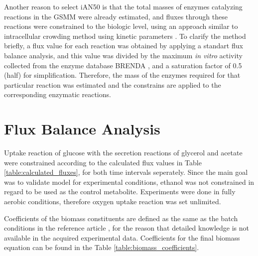 Another reason to select iAN50 is that the total masses of enzymes catalyzing reactions in the GSMM were already estimated, and fluxes through these reactions were constrained to the biologic level, using an approach similar to intracellular crowding method using kinetic parameters \cite{beg2007intracellular, adadi2012prediction}. To clarify the method briefly, a flux value for each reaction was obtained by applying a standart flux balance analysis, and this value was divided by the maximum \emph{in vitro} activity collected from the enzyme database BRENDA \cite{schomburg2012brenda}, and a saturation factor of 0.5 (half) for simplification. Therefore, the mass of the enzymes required for that particular reaction was estimated and the constrains are applied to the corresponding enzymatic reactions.



\section{Flux Balance Analysis}
Uptake reaction of glucose with the secretion reactions of glycerol and acetate were constrained according to the calculated flux values in Table \ref{table:calculated_fluxes}, for both time intervals seperately. Since the main goal was to validate model for experimental conditions, ethanol was not constrained in regard to be used as the control metabolite. Experiments were done in fully aerobic conditions, therefore oxygen uptake reaction was set unlimited.

Coefficients of the biomass constituents are defined as the same as the batch conditions in the reference article \cite{nilsson2016metabolic}, for the reason that detailed knowledge is not available in the acquired experimental data. Coefficients for the final biomass equation can be found in the Table \ref{table:biomass_coefficients}.

